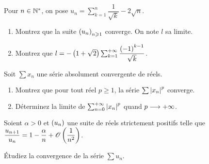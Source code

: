\begin{exo}[Oral X, 18]~\\
Pour \(n\in\mathbb{N}^*\), on pose \(u_n=\sum_{k=1}^n\dfrac{1}{\sqrt{k}}-2\sqrt{n}\).

\begin{enumerate}
    \item Montrez que la suite \(\left(u_n\right)_{n\geqslant1}\) converge. On note \(l\) sa limite. \\
    \item Montrez que \(l=-\left(1+\sqrt{2}\right)\sum_{k=1}^{+\infty}\dfrac{\left(-1\right)^{k-1}}{\sqrt{k}}\).
\end{enumerate}
\end{exo}



\begin{exo}[Oral X, 19]
Soit \(\sum x_n\) une série absolument convergente de réels.

\begin{enumerate}
    \item Montrez que pour tout réel \(p\geq1\), la série \(\sum\left\lvert x_n\right\rvert^p\) converge. \\
    \item Déterminez la limite de \(\sum_{n=0}^{+\infty}\left\lvert x_n\right\rvert^p\) quand \(p\longrightarrow+\infty\).
\end{enumerate}
\end{exo}



\begin{exo}[Oral X, 20]
Soient \(\alpha>0\) et \(\left(u_n\right)\) une suite de réels strictement positifs telle que \(\dfrac{u_{n+1}}{u_n}=1-\dfrac{\alpha}{n}+\mathscr{O}\left(\dfrac{1}{n^2}\right)\).

Étudiez la convergence de la série \(\sum u_n\).
\end{exo}


